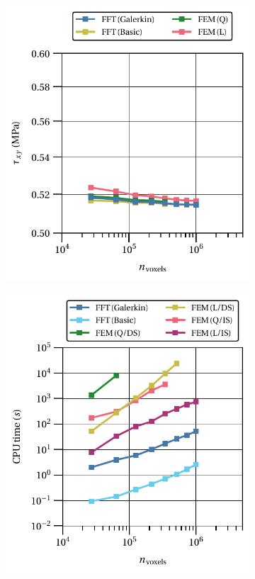 \begin{figure}[hbt] %
  \centering
	\begin{subfigure}[b]{0.49\textwidth}
    \centering
    \includegraphics[width=\textwidth]{figures/linear_3D_shear_homo_stress_12_vs_n_voxels}
    \caption{}
    \label{subfig:linear_3D_shear_homo_stress_12_vs_n_voxels}
  \end{subfigure}
  \begin{subfigure}[b]{0.49\textwidth}
    \centering
    \includegraphics[width=\textwidth]{figures/linear_3D_shear_cpu_time_vs_n_voxels}

\end{subfigure}
\end{figure}
